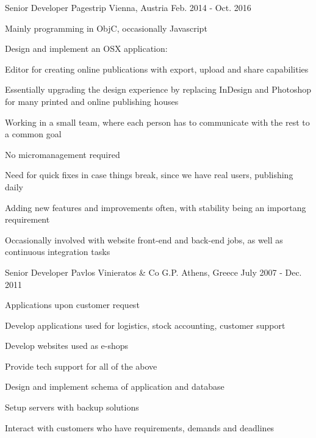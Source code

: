 \begin{cventries}
  \cventry
    {Senior Developer} %
    {Pagestrip} %
    {Vienna, Austria} %
    {Feb. 2014 - Oct. 2016} %
    {
      \begin{cvitems} %
        \item {Mainly programming in ObjC, occasionally Javascript}
      \item {Design and implement an OSX application:}
		\item {Editor for creating online publications with export, upload and share capabilities}
		\item {Essentially upgrading the design experience by replacing InDesign and Photoshop for many printed and online publishing houses}
		\item {Working in a small team, where each person has to communicate with the rest to a common goal}
		\item {No micromanagement required}
		\item {Need for quick fixes in case things break, since we have real users, publishing daily}
		\item {Adding new features and improvements often, with stability being an importang requirement}
        \item {Occasionally involved with website front-end and back-end jobs, as well as continuous integration tasks}
      \end{cvitems}
    }

  \cventry
    {Senior Developer} %
    {Pavlos Vinieratos \& Co G.P.} %
    {Athens, Greece} %
    {July 2007 -  Dec. 2011} %
    {
      \begin{cvitems} %
        \item {Applications upon customer request}
        \item {Develop applications used for logistics, stock accounting, customer support}
		\item {Develop websites used as e-shops}
		\item {Provide tech support for all of the above}
		\item {Design and implement schema of application and database}
		\item {Setup servers with backup solutions}
		\item {Interact with customers who have requirements, demands and deadlines}
      \end{cvitems}
    }

\end{cventries}
